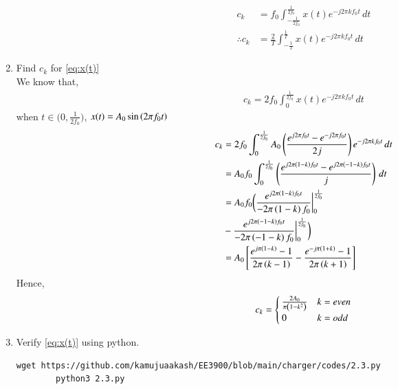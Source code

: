 \documentclass[journal,12pt,twocolumn]{IEEEtran}
\renewcommand\thesection{\arabic{section}}
\begin{document}
\begin{enumerate}[label=\thesection.\arabic*,ref=\thesection.\theenumi]
\begin{align}
    	\end{align}
    \begin{align}
  c_k &= f_0\int_{-\frac{1}{2f_0}}^{\frac{1}{2f_0}}x(t)e^{-j2\pi kf_0 t}\, dt\\
  \therefore c_k &= \frac{2}{T} \int_{-\frac{1}{T}}^{\frac{1}{T}}x(t)e^{-j2\pi kf_0 t}\, dt
    \end{align}
        \item Find $c_k$ for 
        \eqref{eq:x(t)}\\
        \solution
        We know that,
        \begin{align}
        c_k = 2f_0\int_{0}^{\frac{1}{2f_0}}x(t)e^{- j2 \pi kf_0 t}\, dt
        \end{align}
when $t \in \bigg( 0,\frac{1}{2f_0}\bigg)$, $x(t)=A_0 \sin\left(2 \pi f_0t\right)$\\
      \begin{align}
      c_k &= 2f_0\int_{0}^{\frac{1}{2f_0}}A_0 \left(\frac{e^{j2\pi f_0t}-e^{-j 2\pi f_0t}}{2j}\right) e^{- j2 \pi kf_0 t}\,dt\\
      &=A_0f_0\int_{0}^{\frac{1}{2f_0}} \left(\frac{e^{j2\pi\left(1-k\right) f_0t}-e^{j 2\pi\left(-1-k\right) f_0t}}{j}\right)\,dt\\
&=A_0f_0\bigg(\frac{e^{j2\pi\left(1-k\right) f_0t}}{-2\pi \left(1-k\right)f_0}\bigg|_0^{\frac{1}{2f_0}} \\&- \frac{e^{j2\pi\left(-1-k\right) f_0t}}{-2\pi \left(-1-k\right)f_0}\bigg|_0^{\frac{1}{2f_0}}\bigg)\\
&=A_0{}\left[\frac{e^{j\pi\left(1-k\right)}-1}{2\pi\left(k-1\right)}-\frac{e^{-j\pi\left(1+k\right)}-1}{2\pi\left(k+1\right)}\right]
      \end{align}
  Hence,
      \begin{equation}
      \label{eq:ck}
     c_k= \begin{cases}
\frac{2A_0}{\pi\left(1-k^2\right)}&k=even
\\
0&k=odd
\end{cases}
      \end{equation}
    \item Verify 
        \eqref{eq:x(t)}
        using python.\\
        \solution 
        \begin{lstlisting}
wget https://github.com/kamujuaakash/EE3900/blob/main/charger/codes/2.3.py
        python3 2.3.py
        \end{lstlisting}
          \begin{figure}[!ht]
			\centering

\end{figure}
\end{enumerate}
\end{document}

